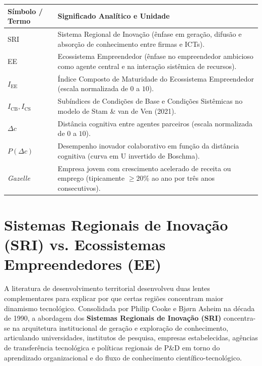 
\begin{boxSimbolo}
\begin{tabularx}{\linewidth}{@{}l X@{}}
  \toprule
  \textbf{Símbolo / Termo} & \textbf{Significado Analítico e Unidade} \\
  \midrule
  SRI & Sistema Regional de Inovação (ênfase em geração, difusão e absorção de conhecimento entre firmas e ICTs). \\
  EE & Ecossistema Empreendedor (ênfase no empreendedor ambicioso como agente central e na interação sistêmica de recursos). \\
  $I_{\text{EE}}$ & Índice Composto de Maturidade do Ecossistema Empreendedor (escala normalizada de $0$ a $10$). \\
  $I_{\text{CB}}, I_{\text{CS}}$ & Subíndices de Condições de Base e Condições Sistêmicas no modelo de Stam \& van de Ven (2021). \\
  $\Delta c$ & Distância cognitiva entre agentes parceiros (escala normalizada de $0$ a $10$). \\
  $P(\Delta c)$ & Desempenho inovador colaborativo em função da distância cognitiva (curva em U invertido de Boschma). \\
  \textit{Gazelle} & Empresa jovem com crescimento acelerado de receita ou emprego (tipicamente $\ge 20\%$ ao ano por três anos consecutivos). \\
  \bottomrule
\end{tabularx}
\end{boxSimbolo}

\section{Sistemas Regionais de Inovação (SRI) vs. Ecossistemas Empreendedores (EE)}

A literatura de desenvolvimento territorial desenvolveu duas lentes complementares para explicar por que certas regiões concentram maior dinamismo tecnológico. Consolidada por Philip Cooke e Bjørn Asheim na década de 1990, a abordagem dos \textbf{Sistemas Regionais de Inovação (SRI)} concentra-se na arquitetura institucional de geração e exploração de conhecimento, articulando universidades, institutos de pesquisa, empresas estabelecidas, agências de transferência tecnológica e políticas regionais de P\&D em torno do aprendizado organizacional e do fluxo de conhecimento científico-tecnológico.

